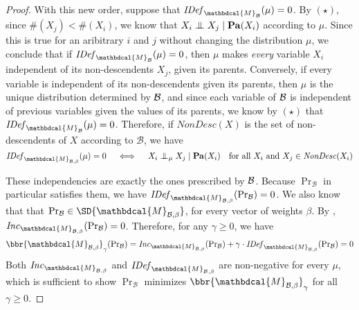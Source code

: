 \documentclass{article}
\theoremstyle{plain}
\theoremstyle{definition}
\theoremstyle{remark}
\let\H\relax
\DeclareMathOperator{\H}{\mathrm{H}} %
\newcommand{\CI}{\mathrel{\perp\mspace{-10mu}\perp}} %
\newcommand{\dg}[1]{\mathbdcal{#1}}
\newcommand\Pa{\mathbf{Pa}}
\newcommand{\IDef}[1]{\mathit{IDef}_{#1}}
\newcommand\Inc{\mathit{Inc}}
\newcommand{\PDGof}[1]{{\dg M}_{#1}}
\numberwithin{equation}{section}
\begin{document}
\begin{proof}
{	
	With this new order, suppose that 
	$\IDef{\PDGof{\cal B}}(\mu) = 0$.
	By $(\star)$, since $\#(X_j) < \#(X_i)$, we know that $X_i \CI X_j \mid \Pa(X_i)$ according to $\mu$. Since this is true for an aribitrary $i$ and $j$ without changing the distribution $\mu$, we conclude that if
	$\IDef{\PDGof{\cal B}}(\mu) = 0$, 
	then $\mu$ makes \emph{every} variable $X_i$ independent of its non-descendents $X_j$, given its parents.
	Conversely, if every variable is independent of its non-descendents given its parents, then $\mu$ is the unique distribution determined by $\cal B$, and since each variable of $\cal B$ is independent of previous variables given the values of its parents,  we know by $(\star)$ that
	$\IDef{\PDGof{\cal B}}(\mu) = 0$. 
	Therefore, if $\mathit{NonDesc}(X)$ is the set of non-descendents of $X$ according to $\mathcal B$, we have
\begin{equation}\label{eq:idef-bn-indeps}
 	\IDef{\PDGof{\mathcal B,\beta}}(\mu) = 0 \quad\iff\quad X_i \CI_\mu X_j \mid \Pa(X_i) \quad\text{for all $X_i$ and $X_j \in \mathit{NonDesc}(X_i)$} 
\end{equation}

These independencies are exactly the ones prescribed by $\cal B$.
Because $\Pr_{\mathcal B}$ in particular satisfies them,
we have $\IDef{\PDGof{\mathcal B,\beta}}(\Pr_{\cal B}) = 0$.
We also know that that $\Pr_{\cal B} \in \SD{\PDGof{\mathcal B,\beta}}$, for
every vector of weights $\beta$. By ,
$\Inc_{\PDGof{\mathcal B,\beta}}(\Pr_{\mathcal B}) = 0$. Therefore, for any
$\gamma \geq 0$, we have
\[ \bbr{\PDGof{\mathcal B, \beta}}_\gamma(\Pr\nolimits_{\cal B})
	= \Inc_{\PDGof{\mathcal B,\beta}}(\Pr\nolimits_{\mathcal B}) + \gamma \cdot
	\IDef{\PDGof{\mathcal B, \beta}}(\Pr\nolimits_{\cal B}) = 0
\]
Both $\Inc_{\PDGof{\mathcal B,\beta}}$ and $\IDef{\PDGof{\mathcal B, \beta}}$
are non-negative for every $\mu$, which is sufficient to show $\Pr_{\mathcal B}$
minimizes $\bbr{\PDGof{\mathcal B, \beta}}_\gamma$ for all $\gamma \geq 0$. 

}
\end{proof}
\end{document}
